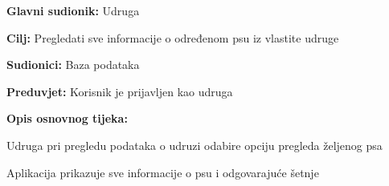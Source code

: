					
					
					\noindent {}
					\begin{packed_item}
	
						\item \textbf{Glavni sudionik:} Udruga
						\item  \textbf{Cilj:} Pregledati sve informacije o određenom psu iz vlastite udruge
						\item  \textbf{Sudionici:} Baza podataka
						\item  \textbf{Preduvjet:} Korisnik je prijavljen kao udruga
						\item  \textbf{Opis osnovnog tijeka:}
						
						\item[] \begin{packed_enum}
							\item Udruga pri pregledu podataka o udruzi odabire opciju pregleda željenog psa
							\item Aplikacija prikazuje sve informacije o psu i odgovarajuće šetnje
							
						\end{packed_enum}
					\end{packed_item}
					
					
					
